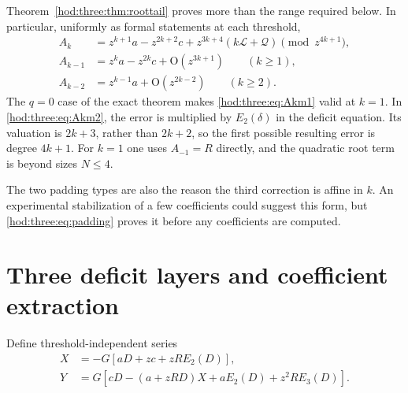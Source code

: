 \documentclass[11pt,letterpaper]{article}
\theoremstyle{definition}\newtheorem{definition}[theorem]{Definition}
\theoremstyle{remark}\newtheorem{remark}[theorem]{Remark}
\newcommand{\OO}{\mathrm O}
\newcommand{\Lcal}{\mathcal L}
\newcommand{\Qcal}{\mathcal Q}
\begin{document}
Theorem~\ref{hod:three:thm:roottail} proves more than the range required below. In particular, uniformly as formal statements at each threshold,
\begin{align}
A_k&=z^{k+1}a-z^{2k+2}c+z^{3k+4}(k\Lcal+\Qcal)
\pmod {z^{4k+1}},\label{hod:three:eq:Ak}\\
A_{k-1}&=z^ka-z^{2k}c+\OO(z^{3k+1})\qquad(k\ge1),\label{hod:three:eq:Akm1}\\
A_{k-2}&=z^{k-1}a+\OO(z^{2k-2})\qquad(k\ge2).\label{hod:three:eq:Akm2}
\end{align}
The $q=0$ case of the exact theorem makes \eqref{hod:three:eq:Akm1} valid at $k=1$. In \eqref{hod:three:eq:Akm2}, the error is multiplied by $E_2(\delta)$ in the deficit equation. Its valuation is $2k+3$, rather than $2k+2$, so the first possible resulting error is degree $4k+1$. For $k=1$ one uses $A_{-1}=R$ directly, and the quadratic root term is beyond sizes $N\le4$.

The two padding types are also the reason the third correction is affine in $k$. An experimental stabilization of a few coefficients could suggest this form, but \eqref{hod:three:eq:padding} proves it before any coefficients are computed.

\section{Three deficit layers and coefficient extraction}\label{hod:three:sec:layers}
Define threshold-independent series
\begin{align}
X&=-G\left[aD+zc+zR E_2(D)\right],\label{hod:three:eq:X}\\
Y&=G\left[cD-(a+zRD)X+aE_2(D)+z^2R E_3(D)\right].\label{hod:three:eq:Y}
\end{align}
\end{document}
